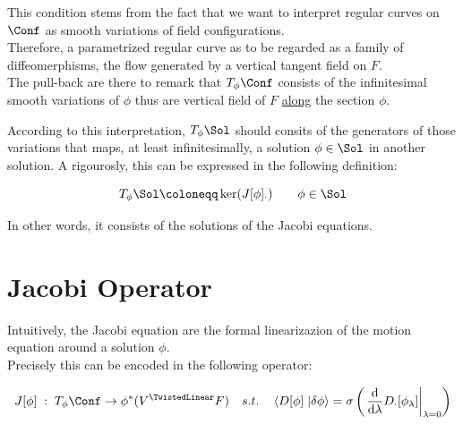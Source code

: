 \documentclass[a4paper,12pt]{scrartcl}  %
\begin{document}
This condition stems from the fact that we want to interpret regular curves on $\Conf$ as smooth variations of field configurations. \\
Therefore, a parametrized regular curve as to be regarded as a family of diffeomerphisms, the flow generated by a vertical tangent field on $F$.\\
The pull-back are there to remark that $T_\phi \Conf$ consists of the infinitesimal smooth variations of $\phi$ thus are vertical field of $F$ \underline{along} the section $\phi$.

According to this interpretation, $T_\phi\Sol$ should consits of the generators of those variations that maps, at least infinitesimally, a solution $\phi\in\Sol$ in another solution.
A rigourosly, this can be expressed in the following definition:

	\begin{definition}\label{Def:TangentSol}
		\begin{displaymath}
			T_\phi \Sol \coloneqq \ker(J[\phi]_\cdot) \qquad \phi \in \Sol
		\end{displaymath}
	\end{definition}
In other words, it consists of the solutions of the Jacobi equations.

\section{Jacobi Operator}\label{Sec:JacobiOperator}
Intuitively, the Jacobi equation are the formal linearizazion of the motion equation around a solution $\phi$.\\
Precisely this can be encoded in the following operator:

	\begin{definition}\label{Def:JacobiOp}
		\begin{displaymath}
			J[\phi] \; : \; T_\phi \Conf \rightarrow	\phi^\ast(V^\TwistedLinear F) \quad s.t. \quad \left\langle D[\phi] \right.\left| \delta\phi \right\rangle
			= \sigma \left( \left.\dfrac{\textrm{d}}{\textrm{d} \lambda} D_\cdot [\phi_\lambda]\right\rvert_{\lambda=0} \right)
		\end{displaymath}
	\end{definition}
\end{document}
